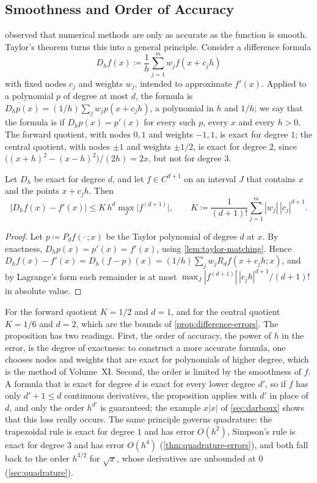 \subsection{Smoothness and Order of Accuracy}

 observed that numerical methods are only as accurate as the function is smooth. Taylor's theorem turns this into a general principle. Consider a difference formula
\[
D_hf(x)\coloneqq\frac1h\sum_{j=1}^mw_jf(x+c_jh)
\]
with fixed nodes $c_j$ and weights $w_j$, intended to approximate $f'(x)$. Applied to a polynomial $p$ of degree at most $d$, the formula is $D_hp(x)=(1/h)\sum_jw_jp(x+c_jh)$, a polynomial in $h$ and $1/h$; we say that the formula is  if $D_hp(x)=p'(x)$ for every such $p$, every $x$ and every $h>0$. The forward quotient, with nodes $0,1$ and weights $-1,1$, is exact for degree $1$; the central quotient, with nodes $\pm1$ and weights $\pm1/2$, is exact for degree $2$, since $\bigl((x+h)^2-(x-h)^2\bigr)/(2h)=2x$, but not for degree $3$.

\begin{proposition}
\label{prop:exactness-order}
Let $D_h$ be exact for degree $d$, and let $f\in C^{d+1}$ on an interval $J$ that contains $x$ and the points $x+c_jh$. Then
\[
\bigl|D_hf(x)-f'(x)\bigr|\le K\,h^d\max_J\bigl|f^{(d+1)}\bigr|,\qquad K\coloneqq\frac1{(d+1)!}\sum_{j=1}^m|w_j|\,|c_j|^{d+1}.
\]
\end{proposition}

\begin{proof}
Let $p\coloneqq P_df(\cdot\,;x)$ be the Taylor polynomial of degree $d$ at $x$. By exactness, $D_hp(x)=p'(x)=f'(x)$, using \cref{lem:taylor-matching}. Hence $D_hf(x)-f'(x)=D_h(f-p)(x)=(1/h)\sum_jw_jR_df(x+c_jh;x)$, and by Lagrange's form each remainder is at most $\max_J|f^{(d+1)}|\,|c_jh|^{d+1}/(d+1)!$ in absolute value.
\end{proof}

For the forward quotient $K=1/2$ and $d=1$, and for the central quotient $K=1/6$ and $d=2$, which are the bounds of \cref{prop:difference-errors}. The proposition has two readings. First, the order of accuracy, the power of $h$ in the error, is the degree of exactness: to construct a more accurate formula, one chooses nodes and weights that are exact for polynomials of higher degree, which is the method of Volume~XI. Second, the order is limited by the smoothness of $f$. A formula that is exact for degree $d$ is exact for every lower degree $d'$, so if $f$ has only $d'+1\le d$ continuous derivatives, the proposition applies with $d'$ in place of $d$, and only the order $h^{d'}$ is guaranteed; the example $x|x|$ of \cref{sec:darboux} shows that this loss really occurs. The same principle governs quadrature: the trapezoidal rule is exact for degree $1$ and has error $O(h^2)$, Simpson's rule is exact for degree $3$ and has error $O(h^4)$ (\cref{thm:quadrature-errors}), and both fall back to the order $h^{3/2}$ for $\sqrt x$, whose derivatives are unbounded at $0$ (\cref{sec:quadrature}).

